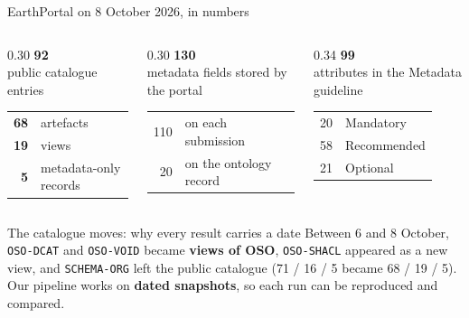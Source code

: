 \documentclass[aspectratio=169,10pt]{beamer}
\newcommand{\code}[1]{{\color{dtblue}\texttt{#1}}}
\newcommand{\bignum}[2]{{\color{#2}\fontsize{26}{28}\selectfont\bfseries #1}}
\begin{document}
\begin{frame}{EarthPortal on 8 October 2026, in numbers}
  \begin{columns}[T]
    \begin{column}{0.30\textwidth}
      \centering
      \bignum{92}{dtnavy}\\[-2pt]
      {\small public catalogue entries}\\[8pt]
      \begin{tabular}{@{}r l@{}}
        \textbf{\textcolor{dtteal}{68}} & artefacts\\
        \textbf{\textcolor{dtindigo}{19}} & views\\
        \textbf{\textcolor{dtgrey}{5}} & metadata-only records\\
      \end{tabular}
    \end{column}
    \begin{column}{0.30\textwidth}
      \centering
      \bignum{130}{dtnavy}\\[-2pt]
      {\small metadata fields stored by the portal}\\[8pt]
      \begin{tabular}{@{}r l@{}}
        110 & on each submission\\
        20 & on the ontology record\\
      \end{tabular}
    \end{column}
    \begin{column}{0.34\textwidth}
      \centering
      \bignum{99}{dtnavy}\\[-2pt]
      {\small attributes in the Metadata guideline}\\[8pt]
      \begin{tabular}{@{}r l@{}}
        20 & Mandatory\\
        58 & Recommended\\
        21 & Optional\\
      \end{tabular}
    \end{column}
  \end{columns}
  \vfill
  \begin{alertblock}{The catalogue moves: why every result carries a date}
    Between 6 and 8 October, \code{OSO-DCAT} and \code{OSO-VOID} became \textbf{views of OSO},
    \code{OSO-SHACL} appeared as a new view, and \code{SCHEMA-ORG} left the public catalogue
    (71 / 16 / 5 became 68 / 19 / 5).
    Our pipeline works on \textbf{dated snapshots}, so each run can be reproduced and compared.
  \end{alertblock}
\end{frame}
\end{document}
